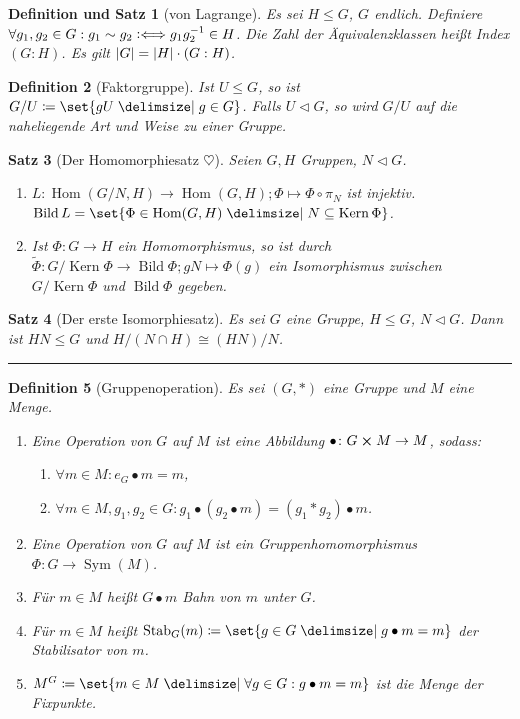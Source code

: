 \documentclass[a4paper]{article}
\newcounter{Sec}
\theoremstyle{marginbreak}
\newtheorem{definition}{Definition}[Sec]
\newtheorem{satz}[definition]{Satz}
\newtheorem{defsatz}[definition]{Definition und Satz}
\newcommand{\sep}{%
	\rule{\textwidth}{0.3pt}%
	\stepcounter{Sec}%
	}
\newcommand{\defiff}{\mathrel{\vcentcolon\Longleftrightarrow}}
\newcommand\nt\triangleleft
\DeclareMathOperator{\Hom}{Hom}
\DeclareMathOperator{\Kern}{Kern}
\DeclareMathOperator{\Bild}{Bild}
\DeclareMathOperator{\Sym}{Sym}
\DeclareMathOperator{\Stab}{Stab}
\begin{document}
\begin{defsatz}[von Lagrange]
	Es sei $H\leq G$, $G$ endlich. Definiere $\forall g_1, g_2\in G: g_1\sim g_2\defiff g_1g_2^{-1}\in H$.
	Die Zahl der Äquivalenzklassen heißt Index $(G:H)$. Es gilt $\abs{G}=\abs{H}\cdot (G:H)$.
\end{defsatz}
\begin{definition}[Faktorgruppe]
	Ist $U\leq G$, so ist $G/U\coloneqq\set{gU\given g\in G}$. Falls $U\nt G$, so wird $G/U$
	auf die naheliegende Art und Weise zu einer Gruppe.
\end{definition}
\begin{satz}[Der Homomorphiesatz $\heartsuit$]
	Seien $G, H$ Gruppen, $N\nt G$.
	\begin{enumerate}[label=(\alph*)]
		\item
			$
				L\colon\Hom(G/N, H)\to\Hom(G, H); \Phi\mapsto \Phi\circ\pi_N
			$
			ist injektiv. $\Bild L=\set{\Phi\in\Hom(G, H)\given N\subseteq\Kern\Phi}$.
		\item Ist $\Phi\colon G\to H$ ein Homomorphismus, so ist durch
			$\tilde{\Phi}\colon G/\Kern\Phi\to \Bild\Phi; gN\mapsto \Phi(g)$ ein
			Isomorphismus zwischen $G/\Kern\Phi$ und $\Bild\Phi$ gegeben.
	\end{enumerate}
\end{satz}
\begin{satz}[Der erste Isomorphiesatz]
	Es sei $G$ eine Gruppe, $H\leq G$, $N\nt G$. Dann ist $HN\leq G$ und $H/(N\cap H)\cong (HN)/N$.
\end{satz}
\sep
\begin{definition}[Gruppenoperation]
	Es sei $(G, *)$ eine Gruppe und $M$ eine Menge.
	\begin{enumerate}[label=(\alph*)]
		\item Eine Operation von $G$ auf $M$ ist eine Abbildung $\bullet\colon G\cross M\to M$, sodass:
			\begin{enumerate}[label=(\alph*)]
				\item $\forall m\in M: e_G\bullet m=m$,
				\item $\forall m\in M, g_1, g_2\in G: g_1\bullet (g_2\bullet m) = (g_1*g_2)\bullet m$.
			\end{enumerate}
		\item Eine Operation von $G$ auf $M$ ist ein Gruppenhomomorphismus $\Phi\colon G\to\Sym(M)$.
		\item Für $m\in M$ heißt $G\bullet m$ Bahn von $m$ unter $G$.
		\item Für $m\in M$ heißt $\Stab_G(m)\coloneqq\set{g\in G\given g\bullet m=m}$ der
			Stabilisator von $m$.
		\item $M^G\coloneqq\set{m\in M\given\forall g\in G:g\bullet m=m}$ ist die Menge der
			Fixpunkte.
	\end{enumerate}
\end{definition}
\end{document}
